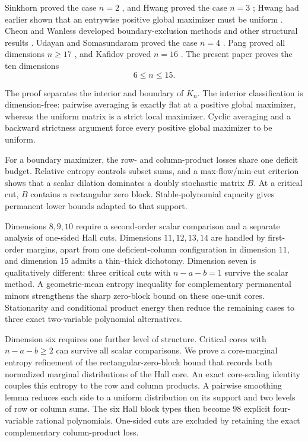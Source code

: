 \documentclass[11pt]{article}
\theoremstyle{definition}
\newcommand{\1}{\mathbf{1}}
\begin{document}
Sinkhorn proved the case $n=2$ \cite{Sinkhorn1984}, and Hwang proved the case
$n=3$ \cite{Hwang1987}; Hwang had earlier shown that an entrywise positive
global maximizer must be uniform \cite{Hwang1986}.  Cheon and Wanless
developed boundary-exclusion methods and other structural results
\cite{CheonWanless2012}.  Udayan and Somasundaram proved the case $n=4$
\cite{UdayanSomasundaram2024}.  Pang proved all dimensions $n\ge17$
\cite{Pang2026}, and Kafidov proved $n=16$ \cite{Kafidov2026}.  The present
paper proves the ten dimensions
\[
 6\le n\le15.
\]

The proof separates the interior and boundary of $K_n$.  The interior
classification is dimension-free: pairwise averaging is exactly flat at a
positive global maximizer, whereas the uniform matrix is a strict local
maximizer.  Cyclic averaging and a backward strictness argument force every
positive global maximizer to be uniform.

For a boundary maximizer, the row- and column-product losses share one
deficit budget.  Relative entropy controls subset sums, and a
max-flow/min-cut criterion shows that a scalar dilation dominates a doubly
stochastic matrix $B$.  At a critical cut, $B$ contains a rectangular zero
block.  Stable-polynomial capacity gives permanent lower bounds adapted to
that support.

Dimensions $8,9,10$ require a second-order scalar comparison and a separate
analysis of one-sided Hall cuts.  Dimensions $11,12,13,14$ are handled by
first-order margins, apart from one deficient-column configuration in
dimension $11$, and dimension $15$ admits a thin--thick dichotomy.
Dimension seven is qualitatively different: three critical cuts with
$n-a-b=1$ survive the scalar method.  A geometric-mean entropy inequality
for complementary permanental minors strengthens the sharp zero-block bound
on these one-unit cores.  Stationarity and conditional product energy then
reduce the remaining cases to three exact two-variable polynomial
alternatives.

Dimension six requires one further level of structure.  Critical cores with
$n-a-b\ge2$ can survive all scalar comparisons.  We prove a
core-marginal entropy refinement of the rectangular-zero-block bound that
records both normalized marginal distributions of the Hall core.  An exact
core-scaling identity couples this entropy to the row and column products.
A pairwise smoothing lemma reduces each side to a uniform distribution on
its support and two levels of row or column sums.  The six Hall block types
then become $98$ explicit four-variable rational polynomials.  One-sided
cuts are excluded by retaining the exact complementary column-product loss.
\end{document}

